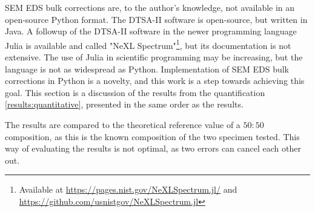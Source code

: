 

SEM EDS bulk corrections are, to the author's knowledge, not available in an open-source Python format.
The DTSA-II software is open-source, but written in Java.
A followup of the DTSA-II software in the newer programming language Julia is available and called "NeXL Spectrum"\footnote{Available at \url{https://pages.nist.gov/NeXLSpectrum.jl/} and \url{https://github.com/usnistgov/NeXLSpectrum.jl}}, but its documentation is not extensive.
The use of Julia in scientific programming may be increasing, but the language is not as widespread as Python.
Implementation of SEM EDS bulk corrections in Python is a novelty, and this work is a step towards achieving this goal.
This section is a discussion of the results from the quantification \cref{results:quantitative}, presented in the same order as the results.



The results are compared to the theoretical reference value of a $50:50$ composition, as this is the known composition of the two specimen tested.
This way of evaluating the results is not optimal, as two errors can cancel each other out.











